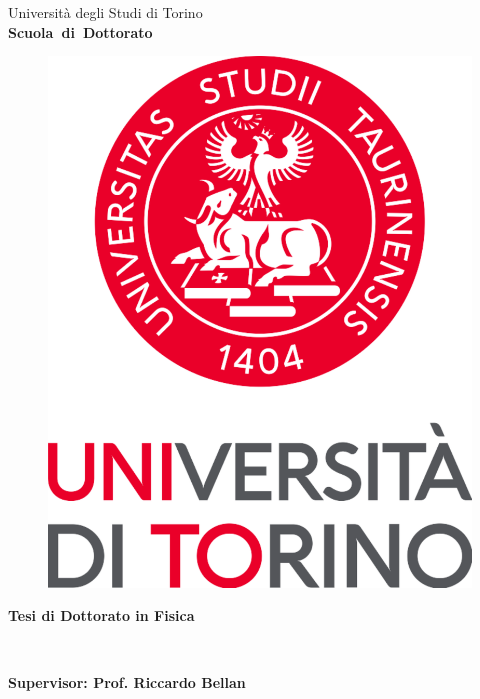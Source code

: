 \begin{titlepage}

\begin{center}
\begin{large}
Universit\`a degli Studi di Torino \\
{\bf Scuola~di~Dottorato}
\end{large}
\end{center}
\hrulefill

\vspace{0.5cm}
\begin{figure}[h]
  \centering
  \includegraphics[width=.2\textheight]{pictures/logoUniversita.pdf}
\end{figure}

\vspace{1cm}
\begin{center}
{\Large \bf Tesi di Dottorato in Fisica}
\end{center}

\vspace{1cm}
\begin{center}
  {\LARGE \bf \thetitle}\\
  \vspace{1cm}
         {\Large \bf \theauthor}
\end{center}

\vspace*{\fill}

{\large \bf Supervisor: Prof. Riccardo Bellan}

\vspace{1cm}
\end{titlepage}
